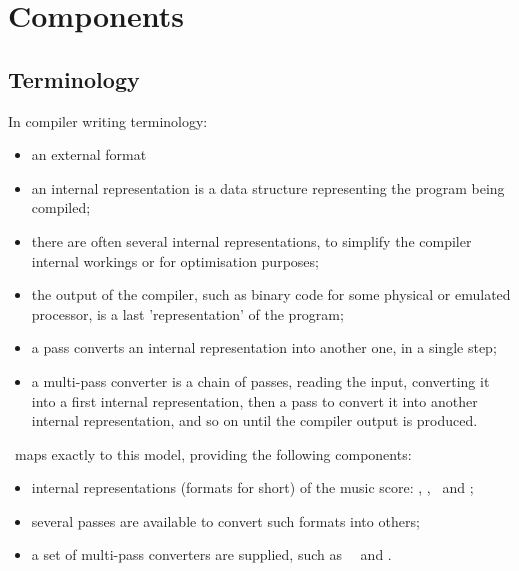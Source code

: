 
\chapter{Components}


\section{Terminology}

In compiler writing terminology:
\begin{itemize}
\item an external format %
\item an internal representation is a data structure representing the program being compiled;
\item there are often several internal representations, to simplify the compiler internal workings or for optimisation purposes;
\item the output of the compiler, such as binary code for some physical or emulated processor, is a last 'representation' of the program;
\item a pass converts an internal representation into another one, in a single step;
\item a multi-pass converter is a chain of passes, reading the input, converting it into a first internal representation, then a pass to convert it into another internal representation, and so on until the compiler output is produced.
\end{itemize}

\mf\ maps exactly to this model, providing the following components:
\begin{itemize}
\item internal representations (formats for short) of the music score: \msrRepr, \lpsrRepr, \bsrRepr\ and \mxsrRepr;
\item several passes are available to convert such formats into others;
\item a set of multi-pass converters are supplied, such as \xmlToLy\, \xmlToXml\ and \msdLangComp.%
\end{itemize}

